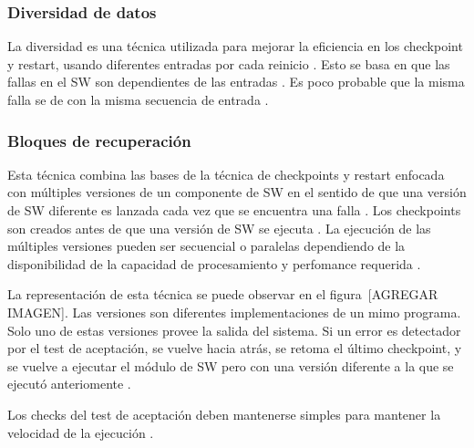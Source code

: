 \subsubsection{Diversidad de datos}
La diversidad es una técnica utilizada para mejorar la eficiencia en los checkpoint y restart, 
usando diferentes entradas por cada reinicio \citep{FTDesign}. Esto se basa en que las fallas en el 
\ac{SW} son dependientes de las entradas \citep{FTDesign}. Es poco probable que la misma falla se 
de con la misma secuencia de entrada \citep{FTDesign}.

\subsubsection{Bloques de recuperación}

Esta técnica combina las bases de la técnica de checkpoints y restart enfocada con múltiples 
versiones de un componente de \ac{SW} en el sentido de que una versión de \ac{SW} diferente es 
lanzada cada vez que se encuentra una falla \citep{SoftwareFaultToleranceATutorial}. Los 
checkpoints son creados antes de que una versión de \ac{SW} se ejecuta 
\citep{SoftwareFaultToleranceATutorial}. La ejecución de las múltiples versiones pueden ser 
secuencial o paralelas dependiendo de la disponibilidad de la capacidad de procesamiento y 
perfomance requerida \citep{SoftwareFaultToleranceATutorial}.

La representación de esta técnica se puede observar en el figura~[AGREGAR IMAGEN]. Las 
versiones son diferentes implementaciones de un mimo programa. Solo uno de estas versiones provee 
la salida del sistema. Si un error es detectador por el test de aceptación, se vuelve hacia atrás, 
se retoma el último checkpoint, y se vuelve a ejecutar el módulo de \ac{SW} pero con una 
versión diferente a la que se ejecutó anteriomente \citep{FTDesign}.  	

Los checks del test de aceptación deben mantenerse simples para mantener la velocidad de la 
ejecución \citep{FTDesign}.

